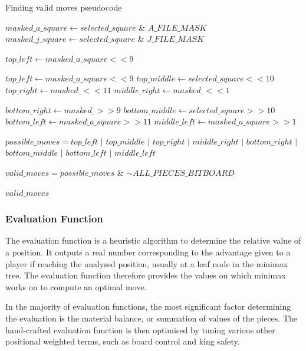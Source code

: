 \documentclass[../main/main.tex]{subfiles}
\begin{document}
\begin{algorithm}[H]
\caption{Finding valid moves pseudocode}
\label{alg:valid-moves}
\begin{algorithmic}
    \State $masked\_a\_square \gets selected\_square$ \&  $A\_FILE\_MASK$
    \State $masked\_j\_square \gets selected\_square$ \& $J\_FILE\_MASK$

    \bigskip

    \State $top\_left \gets masked\_a\_square << 9$
	
	\State $top\_left \gets masked\_a\_square << 9$
	\State $top\_middle \gets selected\_square << 10$
	\State $top\_right \gets masked\_ << 11$
	\State $middle\_right \gets masked\_ << 1$

	\State $bottom\_right \gets masked\_ >> 9$
	\State $bottom\_middle \gets selected\_square >> 10$
	\State $bottom\_left \gets masked\_a\_square >> 11$
	\State $middle\_left \gets masked\_a\_square >> 1$

    \bigskip

    \State $possible\_moves = top\_left$ $\vert$ $top\_middle$ $\vert$ $top\_right$ $\vert$ $middle\_right$ $\vert$ $bottom\_right$ $\vert$ $bottom\_middle$ $\vert$ $bottom\_left$ $\vert$ $middle\_left$

    \State $valid\_moves = possible\_moves$ \& $\sim ALL\_PIECES\_BITBOARD$

    \bigskip

    \State \Return $valid\_moves$
    \EndFunction
\end{algorithmic}
\end{algorithm}

\subsubsection{Evaluation Function}
The evaluation function is a heuristic algorithm to determine the relative value of a position. It outputs a real number corresponding to the advantage given to a player if reaching the analysed position, usually at a leaf node in the minimax tree. The evaluation function therefore provides the values on which minimax works on to compute an optimal move.

In the majority of evaluation functions, the most significant factor determining the evaluation is the material balance, or summation of values of the pieces. The hand-crafted evaluation function is then optimised by tuning various other positional weighted terms, such as board control and king safety. 
\end{document}
